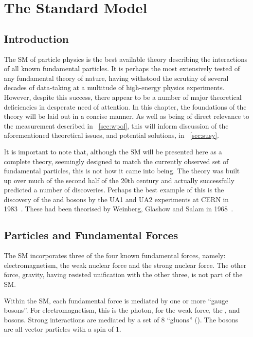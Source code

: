 \chapter{The Standard Model}
\label{sec:sm}
\section{Introduction}
The \acl{SM} of particle physics is the best available theory describing the
interactions of all known fundamental particles. It is perhaps the most
extensively tested of any fundamental theory of nature, having withstood the
scrutiny of several decades of data-taking at a multitude of high-energy physics
experiments. However, despite this success, there appear to be a number of major
theoretical deficiencies in desperate need of attention. In this chapter, the
foundations of the theory will be laid out in a concise manner. As well as being
of direct relevance to the measurement described in \chap~\ref{sec:wpol}, this
will inform discussion of the aforementioned theoretical issues, and potential
solutions, in \chap~\ref{sec:susy}.

It is important to note that, although the \ac{SM} will be presented here as a
complete theory, seemingly designed to match the currently observed set of
fundamental particles, this is not how it came into being. The theory was built
up over much of the second half of the 20th century and actually successfully
predicted a number of discoveries. Perhaps the best example of this is the
discovery of the \PW and \PZ bosons by the UA1 and UA2 experiments at \ac{CERN}
in 1983~\cite{ua1_w, ua1_z}. These had been theorised by Weinberg,
Glashow and Salam in 1968~\cite{weinberg,glashow,salam}.

\section{Particles and Fundamental Forces}
\label{sec:theory:particles}
The \ac{SM} incorporates three of the four known fundamental forces, namely:
electromagnetism, the weak nuclear force and the strong nuclear force. The other
force, gravity, having resisted unification with the other three, is not part of
the \ac{SM}.

Within the \ac{SM}, each fundamental force is mediated by one or more ``gauge
bosons''. For electromagnetism, this is the photon, for the weak force, the
\PWp, \PWm and \PZ bosons. Strong interactions are mediated by a set of 8
``gluons'' (\Pg). The bosons are all vector particles with a spin of 1.


